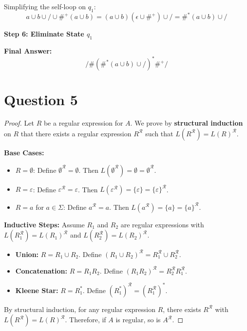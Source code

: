 \documentclass[a4paper, UTF-8]{article}
\theoremstyle{plain}
\begin{document}
Simplifying the self-loop on $q_1$:
\[
a \cup b \cup / \cup \#^+(a \cup b) = (a \cup b)(\epsilon \cup \#^+) \cup / = \#^*(a \cup b) \cup /
\]

\textbf{Step 6: Eliminate State $q_1$}

\begin{center}
\end{center}

\textbf{Final Answer:}
\[
\boxed{/\#\left(\#^*(a \cup b) \cup /\right)^*\#^+/}
\]

\section{Question 5}

\begin{proof}
Let $R$ be a regular expression for $A$. We prove by \textbf{structural induction} on $R$ that there exists a regular expression $R^{\mathcal{R}}$ such that $L(R^{\mathcal{R}}) = L(R)^{\mathcal{R}}$.

\textbf{Base Cases:}
\begin{itemize}
    \item $R = \emptyset$: Define $\emptyset^{\mathcal{R}} = \emptyset$. Then $L(\emptyset^{\mathcal{R}}) = \emptyset = \emptyset^{\mathcal{R}}$.
    \item $R = \varepsilon$: Define $\varepsilon^{\mathcal{R}} = \varepsilon$. Then $L(\varepsilon^{\mathcal{R}}) = \{\varepsilon\} = \{\varepsilon\}^{\mathcal{R}}$.
    \item $R = a$ for $a \in \Sigma$: Define $a^{\mathcal{R}} = a$. Then $L(a^{\mathcal{R}}) = \{a\} = \{a\}^{\mathcal{R}}$.
\end{itemize}

\textbf{Inductive Steps:} Assume $R_1$ and $R_2$ are regular expressions with $L(R_1^{\mathcal{R}}) = L(R_1)^{\mathcal{R}}$ and $L(R_2^{\mathcal{R}}) = L(R_2)^{\mathcal{R}}$.

\begin{itemize}
    \item \textbf{Union:} $R = R_1 \cup R_2$. Define $(R_1 \cup R_2)^{\mathcal{R}} = R_1^{\mathcal{R}} \cup R_2^{\mathcal{R}}$.
    
    \item \textbf{Concatenation:} $R = R_1 R_2$. Define $(R_1 R_2)^{\mathcal{R}} = R_2^{\mathcal{R}} R_1^{\mathcal{R}}$.
    
    \item \textbf{Kleene Star:} $R = R_1^*$. Define $(R_1^*)^{\mathcal{R}} = (R_1^{\mathcal{R}})^*$.
\end{itemize}

By structural induction, for any regular expression $R$, there exists $R^{\mathcal{R}}$ with $L(R^{\mathcal{R}}) = L(R)^{\mathcal{R}}$. Therefore, if $A$ is regular, so is $A^{\mathcal{R}}$.
\end{proof}
\end{document}
